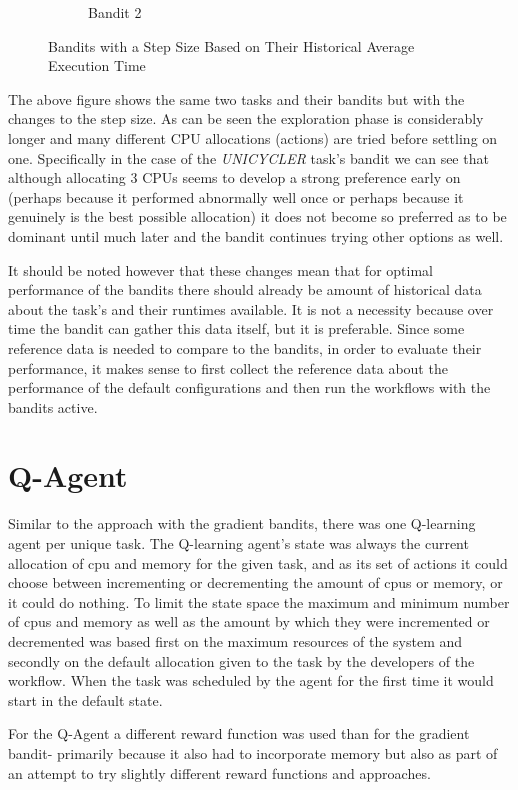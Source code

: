 \begin{figure}[ht]
\begin{subfigure}{.5\textwidth}
  \caption{Bandit 2}
\end{subfigure}
\caption{Bandits with a Step Size Based on Their Historical Average Execution Time}
\label{fig:fixed_bandits}
\end{figure}

The above figure shows the same two tasks and their bandits but with the changes to the step size. As can be seen the exploration phase is considerably longer and many different CPU allocations (actions) are tried before settling on one. Specifically in the case of the \textit{UNICYCLER} task’s bandit we can see that although allocating 3 CPUs seems to develop a strong preference early on (perhaps because it performed abnormally well once or perhaps because it genuinely is the best possible allocation) it does not become so preferred as to be dominant until much later and the bandit continues trying other options as well.

It should be noted however that these changes mean that for optimal performance of the bandits there should already be amount of historical data about the task’s and their runtimes available. It is not a necessity because over time the bandit can gather this data itself, but it is preferable.  Since some reference data is needed to compare to the bandits, in order to evaluate their performance, it makes sense to first collect the reference data about the performance of the default configurations and then run the workflows with the bandits active.

\section{Q-Agent}
\label{sec:q_agent}

Similar to the approach with the gradient bandits, there was one Q-learning agent per unique task. The Q-learning agent’s state was always the current allocation of cpu and memory for the given task, and as its set of actions it could choose between incrementing or decrementing the amount of cpus or memory, or it could do nothing. To limit the state space the maximum and minimum number of cpus and memory as well as the amount by which they were incremented or decremented was based first on the maximum resources of the system and secondly on the default allocation given to the task by the developers of the workflow. When the task was scheduled by the agent for the first time it would start in the default state.


For the Q-Agent a different reward function was used than for the gradient bandit- primarily because it also had to incorporate memory but also as part of an attempt to try slightly different reward functions and approaches. 

